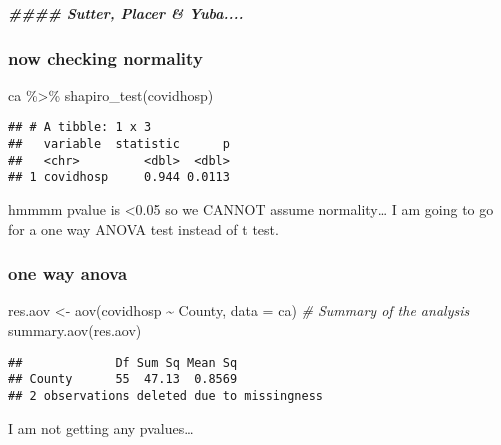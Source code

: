 \documentclass[
]{article}
\newenvironment{Shaded}{\begin{snugshade}}{\end{snugshade}}
\newcommand{\AttributeTok}[1]{\textcolor[rgb]{0.77,0.63,0.00}{#1}}
\newcommand{\CommentTok}[1]{\textcolor[rgb]{0.56,0.35,0.01}{\textit{#1}}}
\newcommand{\DocumentationTok}[1]{\textcolor[rgb]{0.56,0.35,0.01}{\textbf{\textit{#1}}}}
\newcommand{\FunctionTok}[1]{\textcolor[rgb]{0.00,0.00,0.00}{#1}}
\newcommand{\NormalTok}[1]{#1}
\newcommand{\OtherTok}[1]{\textcolor[rgb]{0.56,0.35,0.01}{#1}}
\newcommand{\SpecialCharTok}[1]{\textcolor[rgb]{0.00,0.00,0.00}{#1}}
\begin{document}
\begin{Shaded}
\begin{Highlighting}[]
\DocumentationTok{\#\#\#\# Sutter, Placer \& Yuba....}
\end{Highlighting}
\end{Shaded}

\hypertarget{now-checking-normality}{%
\subsubsection{now checking normality}\label{now-checking-normality}}

\begin{Shaded}
\begin{Highlighting}[]
\NormalTok{ca }\SpecialCharTok{\%\textgreater{}\%} \FunctionTok{shapiro\_test}\NormalTok{(covidhosp)}
\end{Highlighting}
\end{Shaded}

\begin{verbatim}
## # A tibble: 1 x 3
##   variable  statistic      p
##   <chr>         <dbl>  <dbl>
## 1 covidhosp     0.944 0.0113
\end{verbatim}

hmmmm pvalue is \textless0.05 so we CANNOT assume normality\ldots{} I am
going to go for a one way ANOVA test instead of t test.

\hypertarget{one-way-anova}{%
\subsubsection{one way anova}\label{one-way-anova}}

\begin{Shaded}
\begin{Highlighting}[]
\NormalTok{res.aov }\OtherTok{\textless{}{-}} \FunctionTok{aov}\NormalTok{(covidhosp }\SpecialCharTok{\textasciitilde{}}\NormalTok{ County, }\AttributeTok{data =}\NormalTok{ ca)}
\CommentTok{\# Summary of the analysis}
\FunctionTok{summary.aov}\NormalTok{(res.aov)}
\end{Highlighting}
\end{Shaded}

\begin{verbatim}
##             Df Sum Sq Mean Sq
## County      55  47.13  0.8569
## 2 observations deleted due to missingness
\end{verbatim}

I am not getting any pvalues\ldots{}
\end{document}
